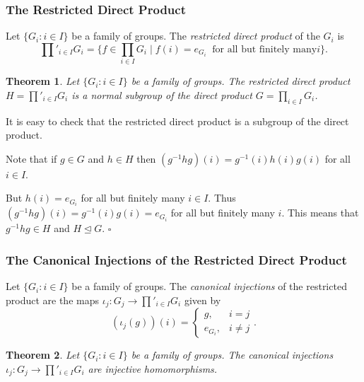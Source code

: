 \documentclass[10pt]{article}
\newtheorem{theorem}{Theorem}[section]
\newenvironment{proof}[1][Proof]{\begin{trivlist}
\item[\hskip \labelsep {\itshape #1}]}{\end{trivlist}}
\newenvironment{definition}[1][Definition]{\begin{trivlist}
\item[\hskip \labelsep {\bfseries #1}]}{\end{trivlist}}
\begin{document}
\subsubsection{The Restricted Direct Product}

\begin{definition}
Let $\{G_i : i \in I\}$ be a family of groups. The \emph{restricted direct product} of the $G_i$ is
$$\prod'_{i \in I} G_i = \{f \in \prod_{i \in I} G_i \;|\; f(i) = e_{G_i} \;\;\mbox{for all but finitely many} i\}.$$
\end{definition}

\begin{theorem}
Let $\{G_i : i \in I\}$ be a family of groups. The restricted direct product $H = \prod'_{i \in I} G_i$ is a normal subgroup of the direct product $G = \prod_{i \in I} G_i$.
\end{theorem}

\begin{proof}
It is easy to check that the restricted direct product is a subgroup of the direct product.

Note that if $g \in G$ and $h \in H$ then $(g^{-1}hg)(i) = g^{-1}(i)h(i)g(i)$ for all $i \in I$.

But $h(i) = e_{G_i}$ for all but finitely many $i \in I$. Thus $(g^{-1}hg)(i) = g^{-1}(i)g(i) = e_{G_i}$ for all but finitely many $i$. This means that $g^{-1}hg \in H$ and $H \mathrel{\unlhd} G$. $\square$
\end{proof}

\subsubsection{The Canonical Injections of the Restricted Direct Product}

\begin{definition}
Let $\{G_i : i \in I\}$ be a family of groups. The \emph{canonical injections} of the restricted product are the maps $\iota_j : G_j \to \prod'_{i \in I} G_i$ given by
$$(\iota_j(g))(i) = \begin{cases}g, & i = j\\e_{G_i}, & i \neq j\end{cases}.$$
\end{definition}

\begin{theorem}
Let $\{G_i : i \in I\}$ be a family of groups. The canonical injections $\iota_j : G_j \to \prod'_{i\in I} G_i$ are injective homomorphisms.
\end{theorem}
\end{document}
